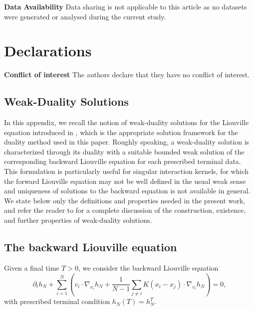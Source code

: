 \documentclass[pdflatex,sn-mathphys-num]{sn-jnl}
\theoremstyle{thmstyleone}%
\theoremstyle{thmstyletwo}%
\theoremstyle{thmstylethree}%
\begin{document}
\medskip

\noindent\textbf{Data Availability}\quad
Data sharing is not applicable to this article as no datasets were
generated or analysed during the current study.

\medskip

\section*{Declarations}

\noindent\textbf{Conflict of interest}\quad
The authors declare that they have no conflict of interest.




\begin{appendices}

\renewcommand{\theequation}{\thesection.\arabic{equation}}
\renewcommand{\theHequation}{\thesection.\arabic{equation}}
\setcounter{equation}{0}

\section{Weak-Duality Solutions}\label{secA1}
In this appendix, we recall the notion of weak-duality solutions for the
Liouville equation introduced in \cite{bresch2024duality}, which is
the appropriate solution framework for the duality method used in this
paper. Roughly speaking, a weak-duality solution is characterized through
its duality with a suitable bounded weak solution of the corresponding
backward Liouville equation for each prescribed terminal data. This
formulation is particularly useful for singular interaction kernels, for
which the forward Liouville equation may not be well defined in the usual
weak sense and uniqueness of solutions to the backward equation is not
available in general. We state below only the definitions and properties
needed in the present work, and refer the reader to
\cite{bresch2024duality} for a complete discussion of the construction,
existence, and further properties of weak-duality solutions.

\subsection*{The backward Liouville equation}
Given a final time $T>0$, we consider the backward Liouville equation
\begin{equation}\label{eq:backward_liouville}
\partial_t h_N
+ \sum_{i=1}^N \left(
v_i \cdot \nabla_{x_i} h_N
+ \frac{1}{N-1}\sum_{j\neq i} K(x_i-x_j)\cdot \nabla_{v_i} h_N
\right)
=0,
\end{equation}
with prescribed terminal condition $h_N(T)=h_N^T$. 


\end{appendices}
\end{document}
